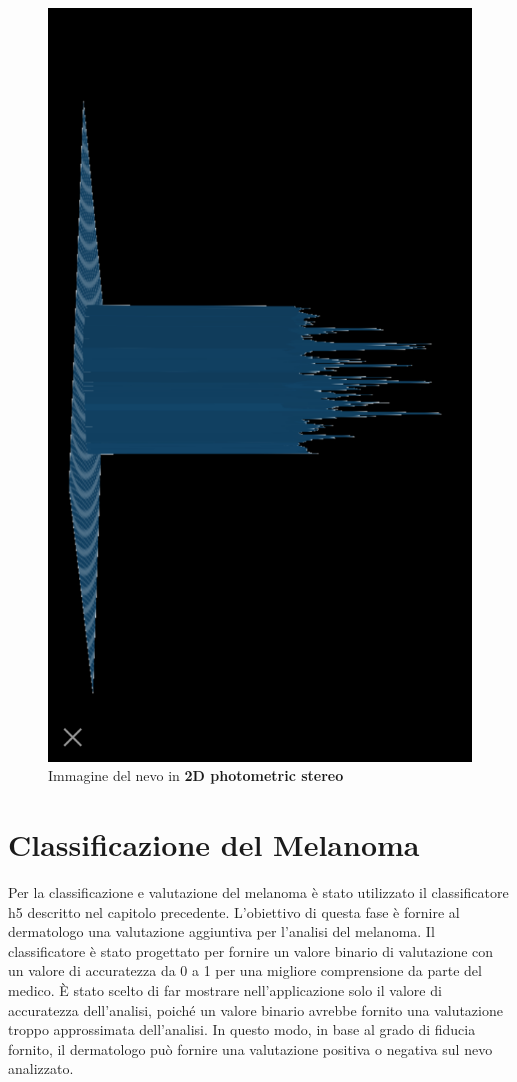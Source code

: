 \begin{figure}[h]
	\begin{center}
		\includegraphics[scale=0.1]{figure/capitolo6/3d.png}
	\end{center}
	\caption{Immagine del nevo in \textbf{2D photometric stereo}}	
\end{figure}
\newpage
\section{Classificazione del Melanoma}
Per la classificazione e valutazione del melanoma è stato utilizzato il classificatore h5 descritto nel capitolo precedente.
L'obiettivo di questa fase è fornire al dermatologo una valutazione aggiuntiva per l'analisi del melanoma. Il classificatore è stato progettato per fornire un valore binario di valutazione con un valore di accuratezza da 0 a 1 per una migliore comprensione da parte del medico.
È stato scelto di far mostrare nell'applicazione solo il valore di accuratezza dell'analisi, poiché un valore binario avrebbe fornito una valutazione troppo approssimata dell'analisi. In questo modo, in base al grado di fiducia fornito, il dermatologo può fornire una valutazione positiva o negativa sul nevo analizzato.
\newpage
